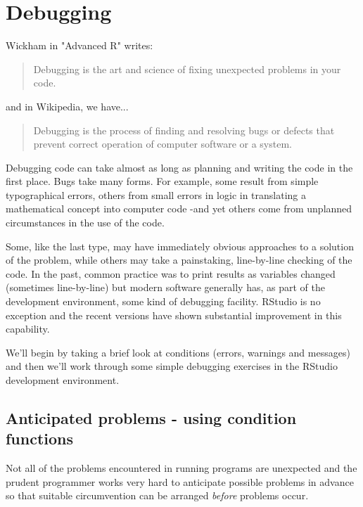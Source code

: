 \documentclass[titlepage]{book}\usepackage{knitr}
\begin{document}
\section{Debugging}

Wickham in "Advanced R" \cite{Wickham2015} writes: 

\begin{quote}
Debugging is the art and science of fixing unexpected problems in your code. 
\end{quote}

and in Wikipedia, we have...

\begin{quote}
Debugging is the process of finding and resolving bugs or defects that prevent correct operation of computer software or a system.
\end{quote}

Debugging code can take almost as long as planning and writing the code in the first place.  Bugs take many forms. For example, some result from simple typographical errors, others from small errors in logic in translating a mathematical concept into computer code -and yet others come from unplanned circumstances in the use of the code. 

Some, like the last type, may have immediately obvious approaches to a solution of the problem, while others may take a painstaking, line-by-line checking of the code. In the past, common practice was to print results as variables changed (sometimes line-by-line) but modern software generally has, as part of the development environment, some kind of debugging facility. RStudio is no exception and the recent versions have shown substantial improvement in this capability.

We'll begin by taking a brief look at conditions (errors, warnings and messages) and then we'll work through some simple debugging exercises in the RStudio development environment.

\subsection{Anticipated problems - using condition functions}

Not all of the problems encountered in running programs are unexpected and the prudent programmer works very hard to anticipate possible problems in advance so that suitable circumvention can be arranged \emph{before} problems occur.
\end{document}
